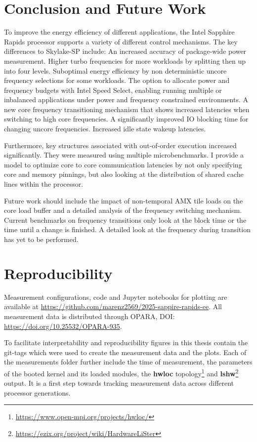 \chapter{Conclusion and Future Work}
\label{sec:summary}

To improve the energy efficiency of different applications, the Intel Sapphire Rapids processor supports a variety of different control mechanisms.
The key differences to Skylake-SP include:
An increased accuracy of package-wide power measurement.
Higher turbo frequencies for more workloads by splitting then up into four levels.
Suboptimal energy efficiency by non deterministic uncore frequency selections for some workloads.
The option to allocate power and frequency budgets with Intel Speed Select, enabling running multiple or inbalanced applications under power and frequency constrained environments.
A new core frequency transitioning mechanism that shows increased latencies when switching to high core frequencies.
A significantly improved IO blocking time for changing uncore frequencies.
Increased idle state wakeup latencies.

Furthermore, key structures associated with out-of-order execution increased significantly.
They were measured using multiple microbenchmarks.
I provide a model to optimize core to core communication latencies by not only specifying core and memory pinnings, but also looking at the distribution of shared cache lines within the processor.

Future work should include the impact of non-temporal AMX tile loads on the core load buffer and a detailed analysis of the frequency switching mechanism.
Current benchmarks on frequency transitions only look at the block time or the time until a change is finished.
A detailed look at the frequency during transition has yet to be performed.

\chapter*{Reproducibility}
Measurement configurations, code and Jupyter notebooks for plotting are available at \url{https://github.com/marenz2569/2025-sappire-rapids-ee}.
All measurement data is distributed through OPARA, DOI: \url{https://doi.org/10.25532/OPARA-935}.

To facilitate interpretability and reproducibility figures in this thesis contain the git-tags which were used to create the measurement data and the plots.
Each of the measurements folder further include the time of measurement, the parameters of the booted kernel and its loaded modules, the \textbf{hwloc} topology\footnote{\url{https://www.open-mpi.org/projects/hwloc/}} and \textbf{lshw}\footnote{\url{https://ezix.org/project/wiki/HardwareLiSter}} output.
It is a first step towards tracking measurement data across different processor generations.